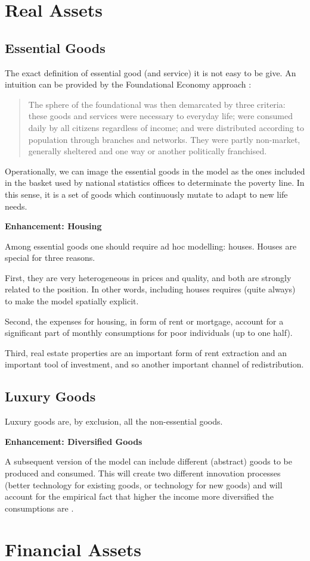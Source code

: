 \documentclass[a4paper, headings=standardclasses]{scrartcl}
\newenvironment{enh}[1][]{\begin{framed}\noindent\textbf{Enhancement: #1}\par}{\end{framed}}
\begin{document}
\section{Real Assets}
\subsection{Essential Goods}
The exact definition of essential good (and service) it is not easy to be give. An intuition can be provided by the Foundational Economy approach \parencite{arcidiacono2018a}: \begin{quote}
	The sphere of the foundational was then demarcated by three criteria: these goods and services were necessary to everyday life; were consumed daily by all citizens regardless of income; and were distributed according to population through branches and networks. They were partly non-market, generally sheltered and one way or another politically franchised.
\end{quote}

Operationally, we can image the essential goods in the model as the ones included in the basket used by national statistics offices to determinate the poverty line. In this sense, it is a set of goods which continuously mutate to adapt to new life needs.

\begin{enh}[Housing]
	Among essential goods one should require ad hoc modelling: houses. Houses are special for three reasons.
	
	First, they are very heterogeneous in prices and quality, and both are strongly related to the position. In other words, including houses requires (quite always) to make the model spatially explicit.
	
	Second, the expenses for housing, in form of rent or mortgage, account for a significant part of monthly consumptions for poor individuals (up to one half).
	
	Third, real estate properties are an important form of rent extraction and an important tool of investment, and so another important channel of redistribution.
\end{enh}

\subsection{Luxury Goods}
Luxury goods are, by exclusion, all the non-essential goods.

\begin{enh}[Diversified Goods]
	A subsequent version of the model can include different (abstract) goods to be produced and consumed. This will  create two different innovation processes (better technology for existing goods, or technology for new goods) and will account for the empirical fact that higher the income more diversified the consumptions are \parencite[cfr.][§2]{didomenico2022}.
\end{enh}

\section{Financial Assets}
	
	\printbibliography
	
\end{document}
